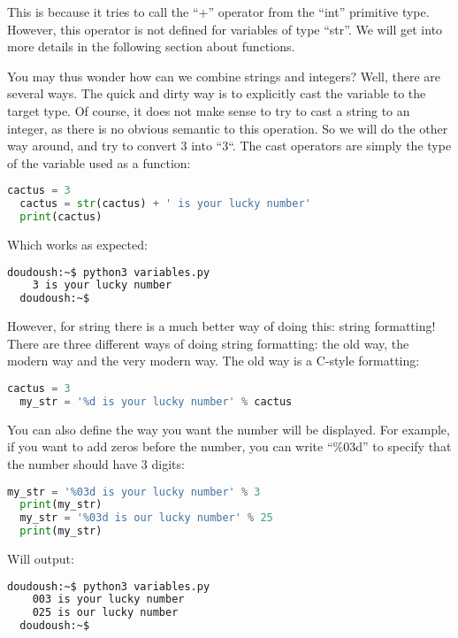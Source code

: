 This is because it tries to call the ``+'' operator from the ``int'' primitive type.
However, this operator is not defined for variables of type ``str''. We will get
into more details in the following section about functions.

\vspace{5mm}

You may thus wonder how can we combine strings and integers? Well, there are
several ways. The quick and dirty way is to explicitly cast the variable to
the target type. Of course, it does not make sense to try to cast a string to
an integer, as there is no obvious semantic to this operation. So we will do
the other way around, and try to convert 3 into ``3``. The cast operators are simply
the type of the variable used as a function:

\begin{lstlisting}[language=python]
  cactus = 3
  cactus = str(cactus) + ' is your lucky number'
  print(cactus)
\end{lstlisting}

Which works as expected:

\begin{lstlisting}[language=bash]
  doudoush:~$ python3 variables.py
    3 is your lucky number
  doudoush:~$
\end{lstlisting}

However, for string there is a much better way of doing this: string formatting!
There are three different ways of doing string formatting: the old way, the modern way
and the very modern way. The old way is a C-style formatting:

\begin{lstlisting}[language=python]
  cactus = 3
  my_str = '%d is your lucky number' % cactus
\end{lstlisting}

You can also define the way you want the number will be displayed. For example, if you
want to add zeros before the number, you can write ``\%03d'' to specify that
the number should have 3 digits:

\begin{lstlisting}[language=python]
  my_str = '%03d is your lucky number' % 3
  print(my_str)
  my_str = '%03d is our lucky number' % 25
  print(my_str)
\end{lstlisting}

Will output:
\begin{lstlisting}[language=bash]
  doudoush:~$ python3 variables.py
    003 is your lucky number
    025 is our lucky number
  doudoush:~$
\end{lstlisting}

